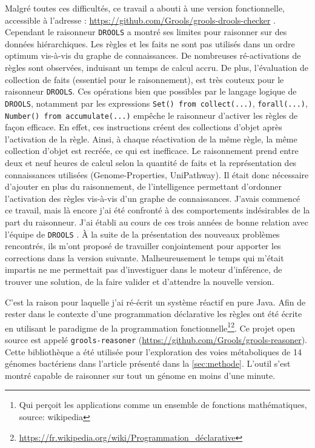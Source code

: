 \begin{refsegment}
Malgré toutes ces difficultés, ce travail a abouti à une version fonctionnelle, accessible à l'adresse : \url{https://github.com/Grools/grools-drools-checker} . Cependant le raisonneur \texttt{DROOLS} a montré ses limites pour raisonner sur des données hiérarchiques. Les règles et les faits ne sont pas utilisés dans un ordre optimum vis-à-vis du graphe de connaissances. De nombreuses ré-activations de règles sont observées, induisant un temps de calcul accru. De plus, l'évaluation de collection de faits (essentiel pour le raisonnement), est très couteux pour le raisonneur \texttt{DROOLS}. Ces opérations bien que  possibles par le langage logique de \texttt{DROOLS}, notamment par les expressions \lstinline[style=drl-style]$Set() from collect(...)$, \lstinline[style=drl-style]$forall(...)$, \lstinline[style=drl-style]$Number() from accumulate(...)$ empêche le raisonneur d'activer les règles de façon efficace. En effet, ces instructions créent des collections d'objet après l'activation de la règle. Ainsi, à chaque réactivation de la même règle, la même collection d'objet est recréée, ce qui est inefficace.  Le raisonnement prend entre deux et neuf heures de calcul selon la quantité de faits et la représentation des connaissances utilisées (Genome-Properties, UniPathway). Il était donc nécessaire d'ajouter en plus du raisonnement, de l'intelligence permettant d'ordonner l'activation des règles vis-à-vis d'un graphe de connaissances. J'avais commencé ce travail, mais là encore j'ai été confronté à des comportements indésirables de la part du raisonneur. J'ai établi au cours de ces trois années de bonne relation avec l'équipe de \texttt{DROOLS} . À la suite de la présentation  des nouveaux problèmes rencontrés, ils m'ont proposé de travailler conjointement pour apporter les corrections dans la version suivante. Malheureusement le temps qui m'était impartis ne me permettait pas d'investiguer dans le moteur d'inférence, de trouver une solution, de la faire valider et d'attendre la nouvelle version.

C'est la raison pour laquelle j'ai ré-écrit un système réactif en pure Java. Afin de rester dans le contexte d'une programmation déclarative les règles ont été écrite en utilisant le paradigme de la programmation fonctionnelle\footnote{Qui perçoit les applications comme un ensemble de fonctions mathématiques, source: wikipedia}\footnote{\url{https://fr.wikipedia.org/wiki/Programmation_déclarative}}. Ce projet open source est appelé \texttt{grools-reasoner} (\url{https://github.com/Grools/grools-reasoner}). Cette bibliothèque a été utilisée pour l'exploration des voies métaboliques de 14 génomes bactériens dans l'article présenté dans la  \cref{sec:methode}. L'outil s'est montré capable de raisonner sur tout un génome en moins d'une minute.


\end{refsegment}
